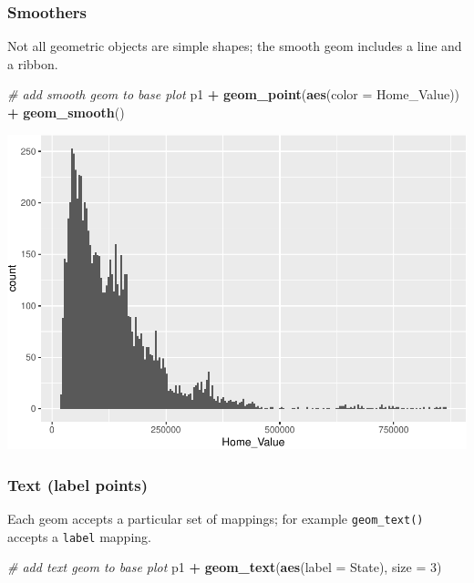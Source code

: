 \documentclass[
]{book}
\newenvironment{Shaded}{\begin{snugshade}}{\end{snugshade}}
\newcommand{\CommentTok}[1]{\textcolor[rgb]{0.56,0.35,0.01}{\textit{#1}}}
\newcommand{\DataTypeTok}[1]{\textcolor[rgb]{0.13,0.29,0.53}{#1}}
\newcommand{\DecValTok}[1]{\textcolor[rgb]{0.00,0.00,0.81}{#1}}
\newcommand{\KeywordTok}[1]{\textcolor[rgb]{0.13,0.29,0.53}{\textbf{#1}}}
\newcommand{\NormalTok}[1]{#1}
\newcommand{\OperatorTok}[1]{\textcolor[rgb]{0.81,0.36,0.00}{\textbf{#1}}}
\newcommand{\StringTok}[1]{\textcolor[rgb]{0.31,0.60,0.02}{#1}}
\begin{document}
\hypertarget{smoothers}{%
\subsubsection{Smoothers}\label{smoothers}}

Not all geometric objects are simple shapes; the smooth geom includes a line and a ribbon.

\begin{Shaded}
\begin{Highlighting}[]
\CommentTok{\# add smooth geom to base plot}
\NormalTok{p1 }\OperatorTok{+}
\StringTok{  }\KeywordTok{geom\_point}\NormalTok{(}\KeywordTok{aes}\NormalTok{(}\DataTypeTok{color =}\NormalTok{ Home\_Value)) }\OperatorTok{+}
\StringTok{  }\KeywordTok{geom\_smooth}\NormalTok{()}
\end{Highlighting}
\end{Shaded}

\includegraphics{R/Rgraphics/figures/unnamed-chunk-161-1.pdf}

\hypertarget{text-label-points}{%
\subsubsection{Text (label points)}\label{text-label-points}}

Each geom accepts a particular set of mappings; for example \texttt{geom\_text()} accepts a \texttt{label} mapping.

\begin{Shaded}
\begin{Highlighting}[]
\CommentTok{\# add text geom to base plot}
\NormalTok{p1 }\OperatorTok{+}\StringTok{ }
\StringTok{  }\KeywordTok{geom\_text}\NormalTok{(}\KeywordTok{aes}\NormalTok{(}\DataTypeTok{label =}\NormalTok{ State), }\DataTypeTok{size =} \DecValTok{3}\NormalTok{)}
\end{Highlighting}
\end{Shaded}
\end{document}
